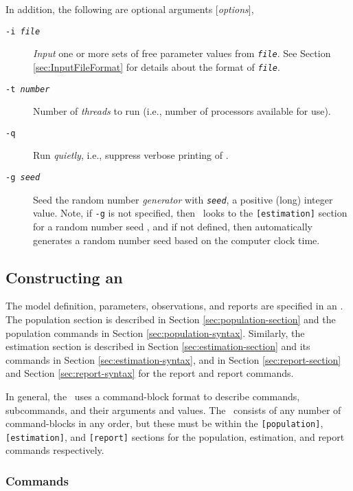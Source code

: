In addition, the following are optional arguments [\emph{options}],

\begin{description}
\item [\texttt{-i \emph{file}}] \emph{Input} one or more sets of free parameter values from \texttt{\emph{file}}. See Section \ref{sec:InputFileFormat} for details about the format of \texttt{\emph{file}}.

\item [\texttt{-t \emph{number}}] Number of \emph{threads} to run (i.e., number of processors available for use).

\item [\texttt{-q}] Run \emph{quietly}, i.e., suppress verbose printing of \SPM.

\item [\texttt{-g \emph{seed}}]  Seed the random number \emph{generator} with \texttt{\emph{seed}}, a positive (long) integer value. Note, if \texttt{-g} is not specified, then \SPM\ looks to the \texttt{[estimation]} section for a random number seed , and if not defined, then automatically generates a random number seed based on the computer clock time.
\end{description}

\subsection{Constructing an \SPM\ \config \label{constructing-spm-config}}

The model definition, parameters, observations, and reports are specified in an \config. The  population section is described in Section \ref{sec:population-section} and the population commands in Section \ref{sec:population-syntax}. Similarly, the estimation section is described in Section \ref{sec:estimation-section} and its commands in Section \ref{sec:estimation-syntax}, and in Section \ref{sec:report-section} and Section \ref{sec:report-syntax} for the report and report commands. 

In general, the \config\ uses a command-block format to describe commands, subcommands, and their arguments and values. The \config\ consists of any number of command-blocks in any order, but these must be within the \texttt{[population]}, \texttt{[estimation]}, and  \texttt{[report]} sections for the population, estimation, and report commands respectively. 

\subsubsection{Commands}

